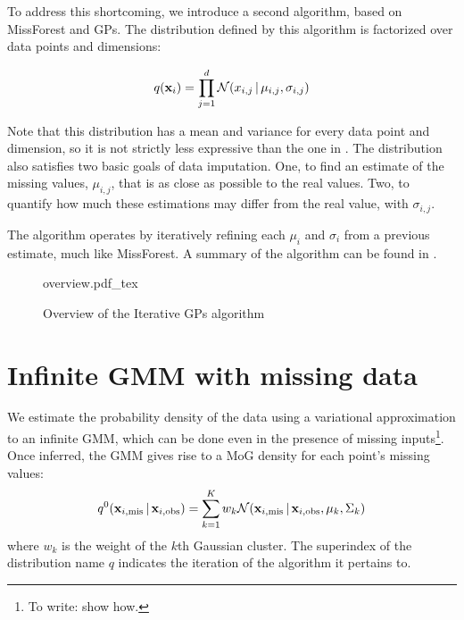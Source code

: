 \documentclass[letterpaper]{article}
\newcommand{\ffref}{\Fref}
\newcommand{\vbar}{\,|\,}
\newcommand{\vx}{{\bf x}}
\begin{document}
To address this shortcoming, we introduce a second algorithm, based on
MissForest and \acfp{GP}. The distribution
defined by this algorithm is factorized over data points and dimensions:

\begin{equation}
 q(\vx_i)= \prod_{j=1}^d \mathcal{N}(x_{i,j} \vbar \mu_{i,j}, \sigma_{i,j})
  \label{eq:point-factored-gaussian}
\end{equation}

Note that this distribution has a mean and variance for every data point and
dimension, so it is not strictly less expressive than the one in
\ffref{eq:point-factored-mog}.
The distribution also satisfies two basic goals of data imputation. One, to find
an estimate of the missing values, $\mu_{i,j}$, that is as close as possible to
the real values. Two, to quantify how much these estimations may differ from the
real value, with $\sigma_{i,j}$.

The algorithm operates by iteratively refining each $\mu_i$ and $\sigma_i$ from
a previous estimate, much like MissForest. A summary of the algorithm can be
found in \ffref{fig:overview}.

\begin{figure}[hbtp]
{overview.pdf_tex}
\caption{Overview of the Iterative \acp{GP} algorithm\label{fig:overview}}
\end{figure}

\section{Infinite \ac{GMM} with missing data}

We estimate the probability density of the data using a variational
approximation to an infinite \ac{GMM}, which can be done even in the presence of
missing inputs\footnote{To write: show how.}. Once
inferred, the \ac{GMM} gives rise to a \ac{MoG} density for each point's missing
values:
\begin{equation}
  q^0(\vx_{i,\text{mis}} \vbar \vx_{i,\text{obs}}) = \sum_{k=1}^K w_k \mathcal{N}(\vx_{i,\text{mis}} \vbar \vx_{i,\text{obs}}, \mu_k, \Sigma_k)
  \label{eq:ini-mog}
\end{equation}
where $w_k$ is the weight of the $k$th Gaussian cluster. The superindex of the
distribution name $q$ indicates the iteration of the algorithm it pertains to.
\end{document}
